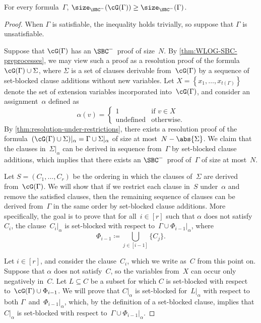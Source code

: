 \documentclass[12pt]{article}
\begin{document}
\begin{lemma}\label{thm:projection-hard-for-SBC}
  For every formula~$\Gamma$,
  $\size_{\SBC^-}(\cG(\Gamma)) \geq \size_{\SBC^-}(\Gamma)$.
\end{lemma}
\begin{proof}
  When $\Gamma$ is satisfiable, the inequality holds trivially,
  so suppose that $\Gamma$ is unsatisfiable.

  Suppose that $\cG(\Gamma)$ has an $\SBC^-$~proof of size~$N$.
  By \cref{thm:WLOG-SBC-preprocesses}, we may view such a proof
  as a resolution proof of the formula~$\cG(\Gamma) \cup \Sigma$,
  where $\Sigma$ is a set of clauses derivable from~$\cG(\Gamma)$
  by a sequence of set-blocked clause additions without new variables.
  Let $X = \left\{x_1, \dots, x_{t(\Gamma)}\right\}$
  denote the set of extension variables incorporated into~$\cG(\Gamma)$,
  and consider an assignment~$\alpha$ defined as
  \begin{equation*}
    \alpha(v) =
    \begin{cases}
      1 & \text{if } v \in X \\
      \text{undefined} & \text{otherwise}.
    \end{cases}
  \end{equation*}
  By \cref{thm:resolution-under-restrictions}, there exists a resolution proof
  of the formula~$(\cG(\Gamma) \cup \Sigma)|_\alpha = \Gamma \cup \Sigma|_\alpha$
  of size at most~$N - \abs{\Sigma}$.
  We claim that the clauses in~$\Sigma|_\alpha$ can be derived
  in sequence from~$\Gamma$ by set-blocked clause additions,
  which implies that there exists
  an $\SBC^-$~proof of~$\Gamma$ of size at most~$N$.

  Let $S = (C_1, \dots, C_r)$ be the ordering in which
  the clauses of~$\Sigma$ are derived from~$\cG(\Gamma)$.
  We will show that if we restrict each clause in~$S$ under~$\alpha$
  and remove the satisfied clauses, then the remaining sequence of clauses
  can be derived from~$\Gamma$ in the same order by set-blocked clause additions.
  More specifically, the goal is to prove that for all~$i \in [r]$
  such that $\alpha$ does not satisfy~$C_i$,
  the clause~$C_i|_\alpha$ is set-blocked
  with respect to~$\Gamma \cup \Phi_{i - 1}|_\alpha$, where
  \begin{equation*}
    \Phi_{i - 1} \coloneqq \bigcup_{j \in [i - 1]} \{C_j\}.
  \end{equation*}

  Let $i \in [r]$, and consider the clause~$C_i$,
  which we write as~$C$ from this point on.
  Suppose that $\alpha$ does not satisfy~$C$,
  so the variables from~$X$ can occur only negatively in~$C$.
  Let $L \subseteq C$ be a subset for which $C$ is set-blocked
  with respect to~$\cG(\Gamma) \cup \Phi_{i - 1}$.
  We will prove that $C|_\alpha$ is set-blocked for~$L|_\alpha$
  with respect to both $\Gamma$~and~$\Phi_{i - 1}|_\alpha$,
  which, by the definition of a set-blocked clause,
  implies that $C|_\alpha$ is set-blocked
  with respect to~$\Gamma \cup \Phi_{i - 1}|_\alpha$.


\end{proof}
\end{document}
